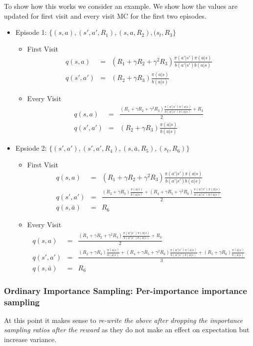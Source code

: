 \documentclass[11pt,a4paper]{article}
\newcommand\bea{\begin{eqnarray}}
\newcommand\eea{\end{eqnarray}}
\begin{document}
To show how this works we consider an example. We show how the values are updated for first visit and every visit MC for the first two episodes. 
\begin{itemize}
\item Episode 1: $\{(s,a),(s',a',R_1),(s,a,R_2),(s_t,R_3\}$ 
\begin{itemize}
\item First Visit
\bea
q(s,a) &=& (R_1 + \gamma R_2+\gamma^2 R_3) \frac{\pi(a'|s') \pi(a|s)}{b(a'|s') b(a|s)} \\
q(s',a') &=& (R_2 + \gamma R_3) \frac{\pi(a|s)}{b(a|s)}
\eea
\item Every Visit
\bea
q(s,a) &=& \frac{(R_1 + \gamma R_2+\gamma^2 R_3) \frac{\pi(a'|s') \pi(a|s)}{b(a'|s') b(a|s)}+R_3}{2} \\
q(s',a') &=& (R_2 + \gamma R_3) \frac{\pi(a|s)}{b(a|s)}
\eea
\end{itemize}
\item  Epsiode 2: $\{(s',a'),(s',a',R_4),(s,\bar a,R_5),(s_t,R_6)\}$
\begin{itemize}
\item First Visit
\bea
q(s,a) &=& (R_1 + \gamma R_2+\gamma^2 R_3) \frac{\pi(a'|s') \pi(a|s)}{b(a'|s') b(a|s)} \\
q(s',a') &=& \frac{(R_2 + \gamma R_3) \frac{\pi(a|s)}{b(a|s)} + (R_4 + \gamma R_5 + \gamma^2 R_6) \frac{\pi(a'|s') \pi(\bar a|s)}{b(a'|s') b(\bar a|s)}}{2} \\
q(s,\bar a) &=& R_6
\eea
\item Every Visit
\bea
q(s,a) &=& \frac{(R_1 + \gamma R_2+\gamma^2 R_3) \frac{\pi(a'|s') \pi(a|s)}{b(a'|s') b(a|s)}+R_3}{2} \\
q(s',a') &=& \frac{(R_2 + \gamma R_3) \frac{\pi(a|s)}{b(a|s)} + (R_4 + \gamma R_5 + \gamma^2 R_6) \frac{\pi(a'|s') \pi(\bar a|s)}{b(a'|s') b(\bar a|s)} + (R_5+ \gamma R_6)  \frac{ \pi(\bar a|s)}{ b(\bar a|s)}}{3} \\
q(s,\bar a) &=& R_6
\eea
\end{itemize}
\end{itemize}

\subsubsection{Ordinary Importance Sampling: Per-importance importance sampling}

At this point it makes sense to {\em re-write the above after dropping the importance sampling ratios after the reward} as they do not make an effect on expectation but increase variance.
 
\end{document}
